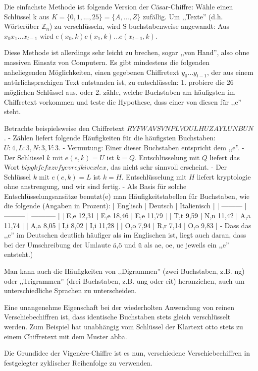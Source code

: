 \documentclass[a4paper]{article}
\begin{document}
\begin{multicols}{3}
Die einfachste Methode ist folgende Version der Cäsar-Chiffre: Wähle einen Schlüssel k aus $K=\{0,1,...,25\}=\{A,...,Z\}$ zufällig. Um ,,Texte'' (d.h. Wörterüber $\mathbb{Z}_n$) zu verschlüsseln, wird S buchstabenweise angewandt: Aus $x_0 x_1...x_{l-1}$ wird $e(x_0,k)e(x_1,k)...e(x_{l-1},k)$.

Diese Methode ist allerdings sehr leicht zu brechen, sogar ,,von Hand'', also ohne massiven Einsatz von Computern. Es gibt mindestens die folgenden naheliegenden Möglichkeiten, einen gegebenen Chiffretext $y_0...y_{l-1}$, der aus einem natürlichsprachigen Text entstanden ist, zu entschlüsseln:
1. probiere die 26 möglichen Schlüssel aus, oder
2. zähle, welche Buchstaben am häufigsten im Chiffretext vorkommen und teste die Hypothese, dass einer von diesen für ,,e'' steht.

Betrachte beispielsweise den Chiffretext $RYFWAVSVNPLVOULHUZAYLUNBUN$. 
- Zählen liefert folgende Häufigkeiten für die häufigsten Buchstaben: $U:4,L:3,N:3,V:3$.
- Vermutung: Einer dieser Buchstaben entspricht dem ,,e''.
- Der Schlüssel $k$ mit $e(e,k)=U$ ist $k=Q$. Entschlüsselung mit $Q$ liefert das Wort $bipgkfcfxzvfyevrejkivexlex$, das nicht sehr sinnvoll erscheint.
- Der Schlüssel $k$ mit $e(e,k)=L$ ist $k=H$. Entschlüsselung mit $H$ liefert kryptologie ohne anstrengung, und wir sind fertig.
- Als Basis für solche Entschlüsselungsansätze benutzt(e) man Häufigkeitstabellen für Buchstaben, wie die folgende (Angaben in Prozent):
    | Englisch  | Deutsch   | Italienisch |
    | --------- | --------- | ----------- |
    | E,e 12,31 | E,e 18,46 | E,e 11,79   |
    | T,t 9,59  | N,n 11,42 | A,a 11,74   |
    | A,a 8,05  | I,i 8,02  | I,i 11,28   |
    | O,o 7,94  | R,r 7,14  | O,o 9,83    |
- Dass das ,,e'' im Deutschen deutlich häufiger als im Englischen ist, liegt auch daran, dass bei der Umschreibung der Umlaute ä,ö und ü als ae, oe, ue jeweils ein ,,e'' entsteht.)

Man kann auch die Häufigkeiten von ,,Digrammen'' (zwei Buchstaben, z.B. ng) oder ,,Trigrammen''  (drei Buchstaben, z.B. ung oder eit) heranziehen, auch um unterschiedliche Sprachen zu unterscheiden.

Eine unangenehme Eigenschaft bei der wiederholten Anwendung von reinen Verschiebechiffren ist, dass identische Buchstaben stets gleich verschlüsselt werden. Zum Beispiel hat unabhängig vom Schlüssel der Klartext otto stets zu einem Chiffretext mit dem Muster abba.

Die Grundidee der Vigenère-Chiffre ist es nun, verschiedene Verschiebechiffren in festgelegter zyklischer Reihenfolge zu verwenden.


\end{multicols}
\end{document}
